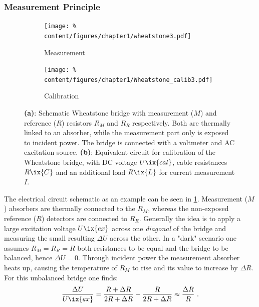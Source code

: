             \subsubsection*{Measurement Principle}%
%
                \begin{figure}[t]%
                    \centering%
                    \begin{subfigure}{0.48\textwidth}%
                        \texttt{[image: \%
                            content/figures/chapter1/wheatstone3.pdf]}%
                        \caption{Measurement}\label{fig:wheatstone}%
                    \end{subfigure}%
                    \hfill%
                    \begin{subfigure}{0.48\textwidth}%
                        \texttt{[image: \%
                            content/figures/chapter1/Wheatstone\_calib3.pdf]}%
                        \caption{Calibration}\label{fig:wheatstone_calib}%
                    \end{subfigure}%
                    \caption{\textbf{(a)}: Schematic Wheatstone bridge with measurement ($M$) and reference ($R$) resistors $R_{M}$ and $R_{R}$ respectively. Both are thermally linked to an absorber, while the measurement part only is exposed to incident power. The bridge is connected with a voltmeter and AC excitation source. \textbf{(b)}: Equivalent circuit for calibration of the Wheatstone bridge, with DC voltage $U\ix{cal}$, cable resistances $R\ix{C}$ and an additional load $R\ix{L}$ for current measurement $I$.}\label{fig:wheatstone_two}%
                \end{figure}%
%
                The electrical circuit schematic as an example can be seen in \cref{fig:wheatstone}. Measurement ($M$) absorbers are thermally connected to the $R_{M}$, whereas the non-exposed reference ($R$) detectors are connected to $R_{R}$. Generally the idea is to apply a large excitation voltage $U\ix{ex}$ across one \textit{diagonal} of the bridge and measuring the small resulting $\Delta U$ across the other. In a "dark" scenario one assumes $R_{M}=R_{R}=R$ both resistances to be equal and the bridge to be balanced, hence $\Delta U=0$. Through incident power the measurement absorber heats up, causing the temperature of $R_{M}$ to rise and its value to increase by $\Delta R$. For this unbalanced bridge one finds:%
%
                \begin{align}%
                    \frac{\Delta U}{U\ix{ex}}=\frac{R+\Delta R}{2R+\Delta R}-\frac{R}{2R+\Delta R}\approx\frac{\Delta R}{R}\,\,.\label{eq:base_wheatstone}%
                \end{align}%
